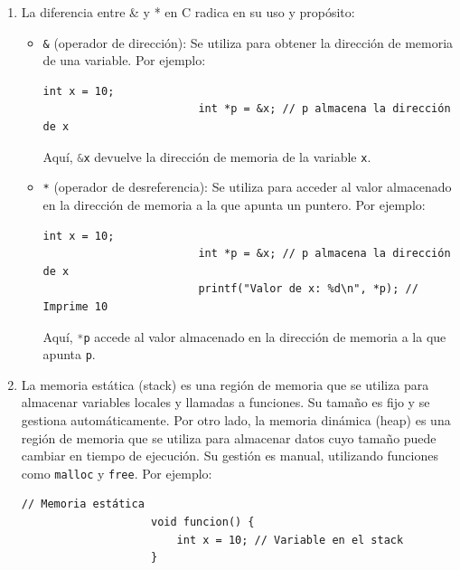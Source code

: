 \documentclass[12pt]{article}
\begin{document}
\begin{enumerate}
\begin{enumerate}[label*=\arabic*.]
\begin{lstlisting}[xleftmargin=-12.1em, inputencoding=utf8]
                    void funcion() {
                        printf("x: %d\n", x);
                    }
                \end{lstlisting}
                Aquí, \lstinline[language=C]|x| es accesible tanto dentro como fuera de \lstinline[language=C]|funcion|.

                \item La diferencia entre \& y * en C radica en su uso y propósito:
                \begin{itemize}
                    \item \texttt{\&} (operador de dirección): Se utiliza para obtener la dirección de memoria de una variable. Por ejemplo:
                    \begin{lstlisting}[xleftmargin=-14.47em, inputencoding=utf8]
                        int x = 10;
                        int *p = &x; // p almacena la dirección de x
                    \end{lstlisting}
                    Aquí, \lstinline[language=C]|&x| devuelve la dirección de memoria de la variable \lstinline[language=C]|x|.

                    \item \texttt{*} (operador de desreferencia): Se utiliza para acceder al valor almacenado en la dirección de memoria a la que apunta un puntero. Por ejemplo:
                    \begin{lstlisting}[xleftmargin=-14.47em, inputencoding=utf8]
                        int x = 10;
                        int *p = &x; // p almacena la dirección de x
                        printf("Valor de x: %d\n", *p); // Imprime 10
                    \end{lstlisting}
                    Aquí, \lstinline[language=C]|*p| accede al valor almacenado en la dirección de memoria a la que apunta \lstinline[language=C]|p|.
                \end{itemize}

                \item La memoria estática (stack) es una región de memoria que se utiliza para almacenar variables locales y llamadas a funciones. Su tamaño es fijo y se gestiona automáticamente. Por otro lado, la memoria dinámica (heap) es una región de memoria que se utiliza para almacenar datos cuyo tamaño puede cambiar en tiempo de ejecución. Su gestión es manual, utilizando funciones como \lstinline[language=C]|malloc| y \lstinline[language=C]|free|. Por ejemplo:
                \begin{lstlisting}[xleftmargin=-12.1em, inputencoding=utf8]
                    // Memoria estática
                    void funcion() {
                        int x = 10; // Variable en el stack
                    }


\end{lstlisting}
\end{enumerate}
\end{enumerate}
\end{document}

